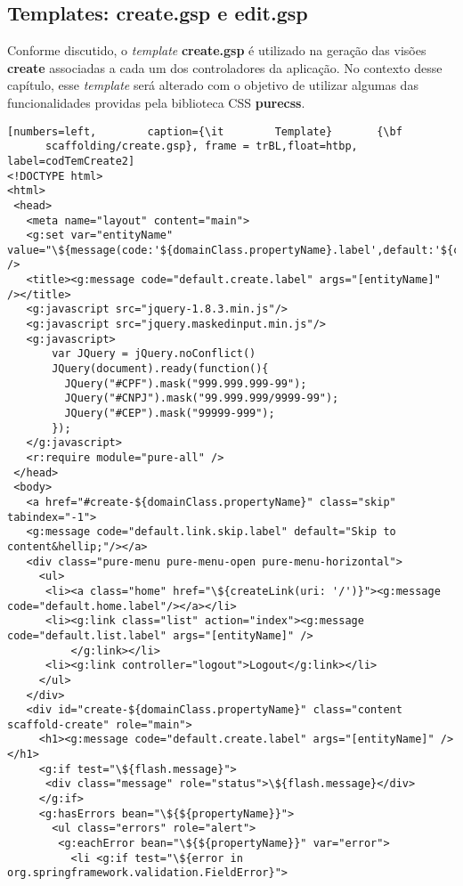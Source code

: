 \subsection{Templates: create.gsp e edit.gsp}

\vspace{0.3cm}

Conforme discutido, o {\it template} {\bf create.gsp} é utilizado na geração das
visões {\bf  create} associadas  a cada um  dos controladores da  aplicação.  No
contexto desse  capítulo, esse  {\it template} será  alterado com o  objetivo de
utilizar  algumas   das  funcionalidades  providas  pela   biblioteca  CSS  {\bf
  purecss}. 

\begin{lstlisting}[numbers=left,        caption={\it        Template}       {\bf
      scaffolding/create.gsp}, frame = trBL,float=htbp, label=codTemCreate2]
<!DOCTYPE html>
<html>
 <head>
   <meta name="layout" content="main">       
   <g:set var="entityName" value="\${message(code:'${domainClass.propertyName}.label',default:'${className}')}" />
   <title><g:message code="default.create.label" args="[entityName]" /></title>
   <g:javascript src="jquery-1.8.3.min.js"/>
   <g:javascript src="jquery.maskedinput.min.js"/> 
   <g:javascript>
       var JQuery = jQuery.noConflict()
       JQuery(document).ready(function(){
         JQuery("#CPF").mask("999.999.999-99");
         JQuery("#CNPJ").mask("99.999.999/9999-99");
         JQuery("#CEP").mask("99999-999");
       });
   </g:javascript>
   <r:require module="pure-all" />
 </head>
 <body>
   <a href="#create-${domainClass.propertyName}" class="skip" tabindex="-1">
   <g:message code="default.link.skip.label" default="Skip to content&hellip;"/></a>
   <div class="pure-menu pure-menu-open pure-menu-horizontal">
     <ul>
      <li><a class="home" href="\${createLink(uri: '/')}"><g:message code="default.home.label"/></a></li>
      <li><g:link class="list" action="index"><g:message code="default.list.label" args="[entityName]" /> 
          </g:link></li>
      <li><g:link controller="logout">Logout</g:link></li>
     </ul>
   </div>
   <div id="create-${domainClass.propertyName}" class="content scaffold-create" role="main">
     <h1><g:message code="default.create.label" args="[entityName]" /></h1>
     <g:if test="\${flash.message}">
      <div class="message" role="status">\${flash.message}</div>
     </g:if>
     <g:hasErrors bean="\${${propertyName}}">
       <ul class="errors" role="alert">
        <g:eachError bean="\${${propertyName}}" var="error">
          <li <g:if test="\${error in org.springframework.validation.FieldError}">

\end{lstlisting}

